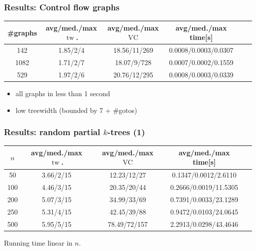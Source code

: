 \documentclass[11pt]{beamer}
\DeclareMathOperator{\tw}{tw}
\DeclareMathOperator{\VC}{VC}
\begin{document}
\begin{frame}
\frametitle{Results: Control flow graphs}

\begin{center}
\footnotesize
\begin{table}[h!]
\centering
\begin{tabular}{|c|c|c|c|c|c|}
\hline
\#graphs & avg/med./max $\tw$. & avg/med./max $\VC$ & avg/med./max time[s] \\
\hline \hline
142 & 1.85/2/4 & 18.56/11/269 & 0.0008/0.0003/0.0307 \\
\hline
1082 & 1.71/2/7 & 18.07/9/728 & 0.0007/0.0002/0.1559 \\
\hline
529 & 1.97/2/6 & 20.76/12/295 & 0.0008/0.0003/0.0339 \\
\hline
\end{tabular}
\end{table}
\end{center}

\begin{itemize}
\item all graphs in less than 1 second
\item low treewidth (bounded by 7 + \#gotos)
\end{itemize}

\end{frame}



\begin{frame}
\frametitle{Results: random partial $k$-trees (1)}

\begin{center}
\footnotesize
\begin{table}[h!]
\centering
\begin{tabular}{|c|c|c|c|c|}
\hline
$n$ & avg/med./max $\tw$. & avg/med./max $\VC$ & avg/med./max time[s] \\
\hline \hline
50 & 3.66/2/15 & 12.23/12/27 & 0.1347/0.0012/2.6110 \\
\hline
100 & 4.46/3/15 & 20.35/20/44 & 0.2666/0.0019/11.5305 \\
\hline
200 & 5.07/3/15 & 34.99/33/69 & 0.7391/0.0033/23.1289 \\
\hline
250 & 5.31/4/15 & 42.45/39/88 & 0.9472/0.0103/24.0645 \\
\hline
500 & 5.95/5/15 & 78.49/72/157 & 2.2913/0.0298/43.4646 \\
\hline
\end{tabular}
\end{table}
\end{center}

Running time linear in $n$.

\end{frame}
\end{document}
